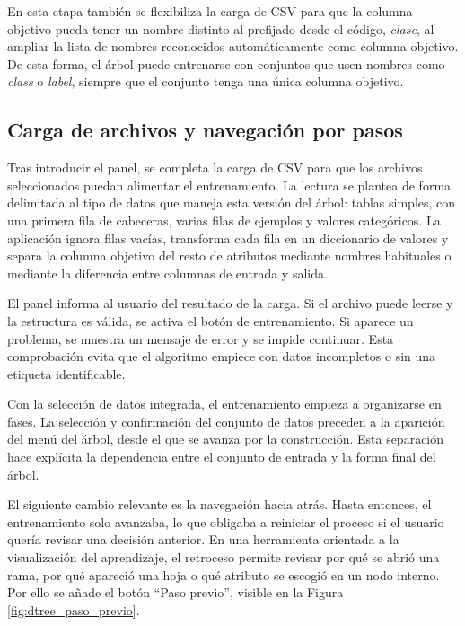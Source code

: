 En esta etapa también se flexibiliza la carga de CSV para que la columna objetivo pueda tener un nombre distinto al prefijado desde el código, \textit{clase}, %
al ampliar la lista de nombres reconocidos automáticamente como columna objetivo.
De esta forma, el árbol puede entrenarse con conjuntos que usen nombres como \textit{class} o \textit{label}, siempre que el conjunto tenga una única columna objetivo.


\subsection{Carga de archivos y navegación por pasos}

Tras introducir el panel, se completa la carga de CSV para que los archivos seleccionados puedan alimentar el entrenamiento.
La lectura se plantea de forma delimitada al tipo de datos que maneja esta versión del árbol: tablas simples, con una primera fila de cabeceras, varias filas de ejemplos y valores categóricos.
La aplicación ignora filas vacías, transforma cada fila en un diccionario de valores y separa la columna objetivo del resto de atributos mediante nombres habituales o mediante la diferencia entre columnas de entrada y salida.

El panel informa al usuario del resultado de la carga.
Si el archivo puede leerse y la estructura es válida, se activa el botón de entrenamiento.
Si aparece un problema, se muestra un mensaje de error y se impide continuar.
Esta comprobación evita que el algoritmo empiece con datos incompletos o sin una etiqueta identificable.

Con la selección de datos integrada, el entrenamiento empieza a organizarse en fases.
La selección y confirmación del conjunto de datos preceden a la aparición del menú del árbol, desde el que se avanza por la construcción.
Esta separación hace explícita la dependencia entre el conjunto de entrada y la forma final del árbol.

El siguiente cambio relevante es la navegación hacia atrás.
Hasta entonces, el entrenamiento solo avanzaba, lo que obligaba a reiniciar el proceso si el usuario quería revisar una decisión anterior.
En una herramienta orientada a la visualización del aprendizaje, el retroceso permite revisar por qué se abrió una rama, por qué apareció una hoja o qué atributo se escogió en un \gls{nodo} interno.
Por ello se añade el botón ``Paso previo'', visible en la Figura \ref{fig:dtree_paso_previo}.

